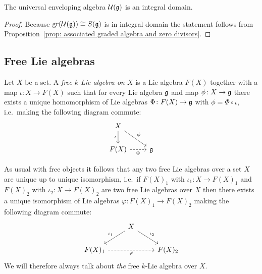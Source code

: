 \begin{cor}
 The universal enveloping algebra $\mathcal{U}(\mathfrak{g})$ is an integral domain.
\end{cor}
\begin{proof}
 Because $\operatorname{gr}(\mathcal{U}(\mathfrak{g})) \cong S(\mathfrak{g})$ is in integral domain the statement follows from Proposition~\ref{prop: associated graded algebra and zero divisors}.
\end{proof}





\subsection{Free Lie algebras}


\begin{defi}
 Let $X$ be a set. A \emph{free $k$-Lie algebra on $X$} is a Lie algebra $F(X)$ together with a map $\iota \colon X \to F(X)$ such that for every Lie algebra $\mathfrak{g}$ and map $\phi \colon X \to \mathfrak{g}$ there exists a unique homomorphism of Lie algebras $\Phi \colon F(X) \to \mathfrak{g}$ with $\phi = \Phi \circ \iota$, i.e.\ making the following diagram commute:
 \[
   \begin{tikzcd}
     X
     \arrow{dr}[above right]{\phi}
     \arrow{d}[left]{\iota}
     &
     {}
     \\
     F(X)
     \arrow[dashed]{r}[below]{\Phi}
     &
     \g
   \end{tikzcd}
 \]
\end{defi}


\begin{rem}
 As usual with free objects it follows that any two free Lie algebras over a set $X$ are unique up to unique isomorphism, i.e.\ if $F(X)_1$ with $\iota_1 \colon X \to F(X)_1$ and $F(X)_2$ with $\iota_2 \colon X \to F(X)_2$ are two free Lie algebras over $X$ then there exists a unique isomorphism of Lie algebras $\varphi \colon F(X)_1 \to F(X)_2$ making the following diagram commute:
 \[
   \begin{tikzcd}
     {}
     &
     X
     \arrow{dl}[above left]{\iota_1}
     \arrow{dr}[above right]{\iota_2}
     &
     {}
     \\
     F(X)_1
     \arrow[dashed]{rr}[below]{\varphi}
     &
     {}
     &
     F(X)_2
   \end{tikzcd}
 \]
 We will therefore always talk about \emph{the} free $k$-Lie algebra over $X$.
\end{rem}


